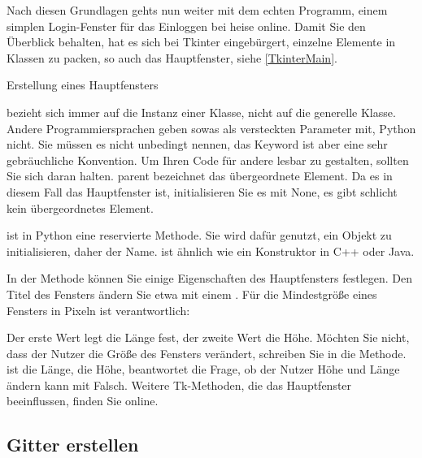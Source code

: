 Nach diesen Grundlagen gehts nun weiter mit dem echten Programm, einem simplen Login-Fenster für das Einloggen bei heise online. Damit Sie den Überblick behalten, hat es sich bei Tkinter eingebürgert, einzelne Elemente in Klassen zu packen, so auch das Hauptfenster, siehe \ref{TkinterMain}.

\begin{code}
     
     
    \caption{Erstellung eines Hauptfensters}\label{TkinterMain}
\end{code}   




 bezieht sich immer auf die Instanz einer Klasse, nicht auf die generelle Klasse. Andere Programmiersprachen geben sowas als versteckten Parameter mit, Python nicht. Sie müssen es nicht unbedingt  nennen, das Keyword ist aber eine sehr gebräuchliche Konvention. Um Ihren Code für andere lesbar zu gestalten, sollten Sie sich daran halten. parent bezeichnet das übergeordnete Element. Da es in diesem Fall das Hauptfenster ist, initialisieren Sie es mit None, es gibt schlicht kein übergeordnetes Element.

 ist in Python eine reservierte Methode. Sie wird dafür genutzt, ein Objekt zu initialisieren, daher der Name.  ist ähnlich wie ein Konstruktor in C++ oder Java.

In der Methode  können Sie einige Eigenschaften des Hauptfensters festlegen. Den Titel des Fensters ändern Sie etwa mit einem . Für die Mindestgröße eines Fensters in Pixeln ist  verantwortlich:

\medskip


\medskip


Der erste Wert legt die Länge fest, der zweite Wert die Höhe. Möchten Sie nicht, dass der Nutzer die Größe des Fensters verändert, schreiben Sie  in die Methode.  ist die Länge,  die Höhe,  beantwortet die Frage, ob der Nutzer Höhe und Länge ändern kann mit Falsch. Weitere Tk-Methoden, die das Hauptfenster beeinflussen, finden Sie online.

\subsection{Gitter erstellen}

